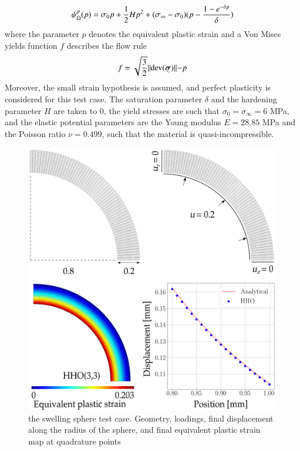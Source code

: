 \begin{equation}
    \psi{}_{\Omega{}}^p(p)
    =
    \sigma_0 p + \frac{1}{2} H p^2 + (\sigma_{\infty} - \sigma_0)(p - \frac{1 - e^{-\delta p}}{\delta})
\end{equation}
%
%
%
where the parameter $p$ denotes the equivalent plastic strain and a Von Mises yields function $f$ describes the flow rule
%
%
%
\begin{equation}
    f = \sqrt{\frac{3}{2}} \rVert \text{dev} (\tensorii{\sigma}) \lVert - p
\end{equation}
%
%
%
Moreover, the small strain hypothesis is assumed, and
perfect plasticity is considered for this test case. The saturation parameter $\delta$ and the hardening parameter $H$ are taken to $0$, the yield stresses are such that $\sigma_0 = \sigma_{\infty} = 6$ MPa, and the elastic potential parameters are the Young modulus $E = 28.85$ MPa and the Poisson ratio $\nu = 0.499$, such that the material is quasi-incompressible.

\begin{figure}[H]
    \centering
    \includegraphics[width=12.cm]{../chapter_002_hho_mechanics/figures/sphere_mesh.png}
    \caption{the swelling sphere test case. Geometry, loadings, final displacement along the radius of the sphere, and final equivalent plastic strain map at quadrature points}
    \label{fig_sphereall}
\end{figure}


